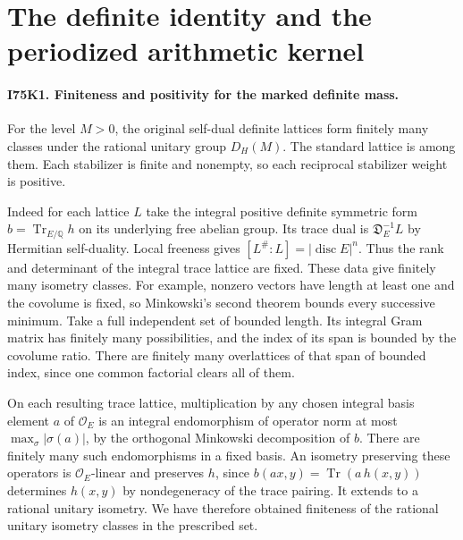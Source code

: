 \section{The definite identity and the periodized arithmetic kernel}

\paragraph{I75K1. Finiteness and positivity for the marked definite mass.}
For the level $M>0$, the original self-dual definite lattices form
finitely many classes under the rational unitary group $D_H(M)$.
The standard lattice is among them. Each stabilizer is finite and
nonempty, so each reciprocal stabilizer weight is positive.

Indeed for each lattice $L$ take the integral positive definite
symmetric form $b=\operatorname{Tr}_{E/\mathbb Q}h$ on its
underlying free abelian group. Its trace dual is
$\mathfrak D_E^{-1}L$ by Hermitian self-duality. Local freeness gives
$[L^{\#}:L]=|\operatorname{disc}E|^n$. Thus the rank and determinant
of the integral trace lattice are fixed. These data give finitely
many isometry classes. For example, nonzero vectors have length
at least one and the covolume is fixed, so Minkowski's second theorem
bounds every successive minimum. Take a full independent set of
bounded length. Its integral Gram matrix has finitely many
possibilities, and the index of its span is bounded by the
covolume ratio. There are finitely many overlattices of that span
of bounded index, since one common factorial clears all of them.

On each resulting trace lattice, multiplication by any chosen
integral basis element $a$ of $\mathcal O_E$ is an integral
endomorphism of operator norm at most $\max_\sigma|\sigma(a)|$,
by the orthogonal Minkowski decomposition of $b$. There are
finitely many such endomorphisms in a fixed basis. An isometry
preserving these operators is $\mathcal O_E$-linear and preserves
$h$, since $b(ax,y)=\operatorname{Tr}(a\,h(x,y))$ determines
$h(x,y)$ by nondegeneracy of the trace pairing. It extends to a
rational unitary isometry. We have therefore obtained finiteness
of the rational unitary isometry classes in the prescribed set.


